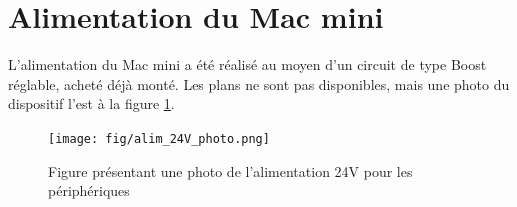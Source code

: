 \section{Alimentation du Mac mini}
L'alimentation du Mac mini a été réalisé au moyen d'un circuit de type Boost réglable, acheté déjà monté. Les plans ne sont pas disponibles, mais une photo du dispositif l'est à la figure \ref{fig:alim24Vphoto}.

\begin{figure}[htbp]
\centering
\texttt{[image: fig/alim\_24V\_photo.png]}
\label{fig:alim24Vphoto}
\caption{Figure présentant une photo de l'alimentation 24V pour les périphériques}
\end{figure}

